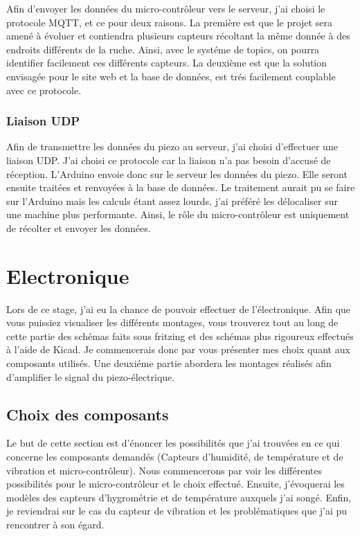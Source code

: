 \documentclass[12pt,french,a4paper]{article}
\begin{document}
Afin d'envoyer les données du micro-contrôleur vers le serveur, j'ai choisi le protocole MQTT, et ce pour deux raisons. La première est que le projet sera amené à évoluer et contiendra plusieurs capteurs récoltant la même donnée à des endroits différents de la ruche. Ainsi, avec le systéme de topics, on pourra identifier facilement ces différents capteurs. La deuxième est que la solution envisagée pour le site web et la base de données, est trés facilement couplable avec ce protocole. 

\subsubsection{Liaison UDP}
Afin de transmettre les données du piezo au serveur, j'ai choisi d'effectuer une liaison UDP. J'ai choisi ce protocole car la liaison n'a pas besoin d'accusé de réception. L'Arduino envoie donc sur le serveur les données du piezo.
Elle seront ensuite traitées et renvoyées à la base de données. 
Le traitement aurait pu se faire sur l'Arduino mais les calculs étant assez lourds, j'ai préféré les délocaliser sur une machine plus performante. Ainsi, le rôle du micro-contrôleur est uniquement de récolter et envoyer les données. 

\newpage
\section{Electronique}
Lors de ce stage, j'ai eu la chance de pouvoir effectuer de l'électronique. Afin que vous puissiez visualiser les différents montages, vous trouverez tout au long de cette partie des schémas faits sous fritzing et des schémas plus rigoureux effectués à l'aide de Kicad. Je commencerais donc par vous présenter mes choix quant aux composants utilisés. Une deuxiéme partie abordera les montages réalisés afin d'amplifier le signal du piezo-électrique.
\subsection{Choix des composants}

Le but de cette section est d'énoncer les possibilités que j'ai trouvées en ce qui concerne les composants demandés (Capteurs d'humidité, de température et de vibration et micro-contrôleur). Nous commencerons par voir les différentes possibilités pour le micro-contrôleur et le choix effectué. Ensuite, j'évoquerai les modèles des capteurs d'hygrométrie et de température auxquels j'ai songé. Enfin, je reviendrai sur le cas du capteur de vibration et les problématiques que j'ai pu rencontrer à son égard.
\end{document}
